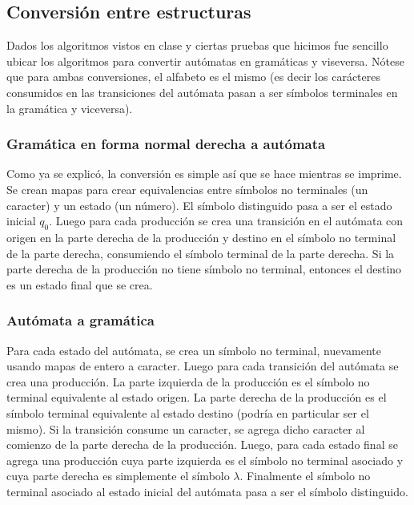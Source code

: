 \documentclass[a4paper,10pt]{article}
\begin{document}
      \subsection{Conversión entre estructuras}
            Dados los algoritmos vistos en clase y ciertas pruebas que hicimos fue sencillo ubicar los algoritmos
            para convertir autómatas en gramáticas y viseversa. Nótese que para ambas conversiones, el alfabeto es el mismo (es decir los carácteres 
consumidos en las transiciones del autómata pasan a ser símbolos terminales en la gramática y viceversa).
\subsubsection{Gramática en forma normal derecha a autómata}
Como ya se explicó, la conversión es simple así que se hace mientras se imprime. Se crean mapas para crear equivalencias entre 
símbolos no terminales (un caracter) y un estado (un número). El símbolo distinguido pasa a ser el estado inicial $q_{0}$. Luego para cada producción 
se crea una transición en el autómata con origen en la parte derecha de la producción y destino en el símbolo no terminal de la parte derecha, consumiendo 
el símbolo terminal de la parte derecha. Si la parte derecha de la producción no tiene símbolo no terminal, entonces el destino es un estado final que se 
crea. 
\subsubsection{ Autómata a gramática }
           Para cada estado del autómata, se crea un símbolo no terminal, nuevamente usando mapas de entero a caracter. Luego para cada transición del 
autómata se crea una producción. La parte izquierda de la producción es el símbolo no terminal equivalente al estado origen. La parte derecha de 
la producción es el símbolo terminal equivalente al estado destino (podría en particular ser el mismo). Si la transición consume un caracter, 
se agrega dicho caracter al comienzo de la parte derecha de la producción. Luego, para cada estado final se agrega una producción cuya parte izquierda 
es el símbolo no terminal asociado y cuya parte derecha es simplemente el símbolo $\lambda$. Finalmente el símbolo no terminal asociado al estado inicial 
del autómata pasa a ser el símbolo distinguido.
 
\end{document}
